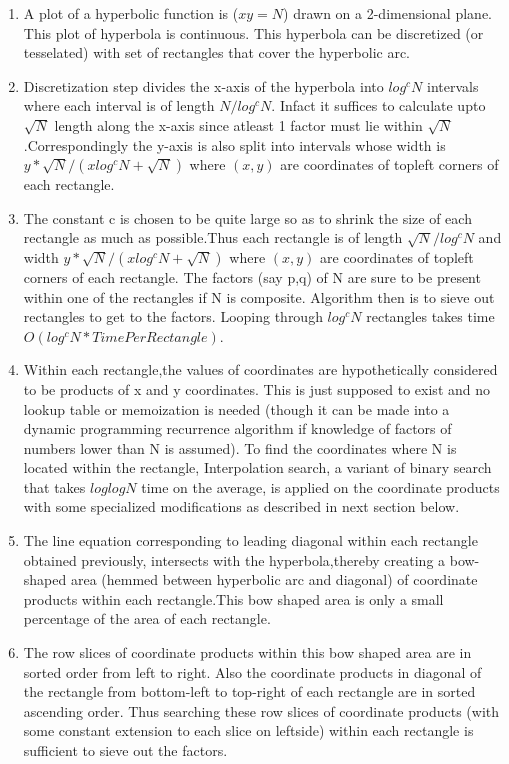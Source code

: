 \documentclass[11pt,onecolumn]{article}
\begin{document}
\begin{enumerate}
\item A plot of a hyperbolic function is ($xy = N$) drawn on a 2-dimensional plane. This plot of hyperbola is continuous. This hyperbola can be discretized (or tesselated) with set of rectangles that cover the hyperbolic arc. 
\item Discretization step divides the x-axis of the hyperbola into $log^{c}N$ intervals where each interval is of length $N/log^{c}N$. Infact it suffices to calculate upto $\sqrt{N}$ length along the x-axis since atleast 1 factor must lie within $\sqrt{N}$.Correspondingly the y-axis is also split into intervals whose width is $y*\sqrt{N}/(xlog^{c}N+\sqrt{N})$ where $(x,y)$ are coordinates of topleft corners of each rectangle.
\item The constant c is chosen to be quite large so as to shrink the size of each rectangle as much as possible.Thus each rectangle is of length $\sqrt{N}/log^{c}N$ and width $y*\sqrt{N}/(xlog^{c}N+\sqrt{N})$ where $(x,y)$ are coordinates of topleft corners of each rectangle. The factors (say p,q) of N are sure to be present within one of the rectangles if N is composite. Algorithm then is to sieve out rectangles to get to the factors. Looping through $log^{c}N$ rectangles takes time $O(log^{c}N * TimePerRectangle)$.
\item Within each rectangle,the values of coordinates are hypothetically considered to be products of x and y coordinates. This is just supposed to exist and no lookup table or memoization is needed (though it can be made into a dynamic programming recurrence algorithm if knowledge of factors of numbers lower than N is assumed). To find the coordinates where N is located within the rectangle, Interpolation search, a variant of binary search that takes $loglogN$ time on the average, is applied on the coordinate products with some specialized modifications as described in next section below.  
\item The line equation corresponding to leading diagonal within each rectangle obtained previously, intersects with the hyperbola,thereby creating a bow-shaped area (hemmed between hyperbolic arc and diagonal) of coordinate products within each rectangle.This bow shaped area is only a small percentage of the area of each rectangle.
\item The row slices of coordinate products within this bow shaped area are in sorted order from left to right. Also the coordinate products in diagonal of the rectangle from bottom-left to top-right of each rectangle are in sorted ascending order. Thus searching these row slices of coordinate products (with some constant extension to each slice on leftside) within each rectangle is sufficient to sieve out the factors.
\end{enumerate}
\end{document}
